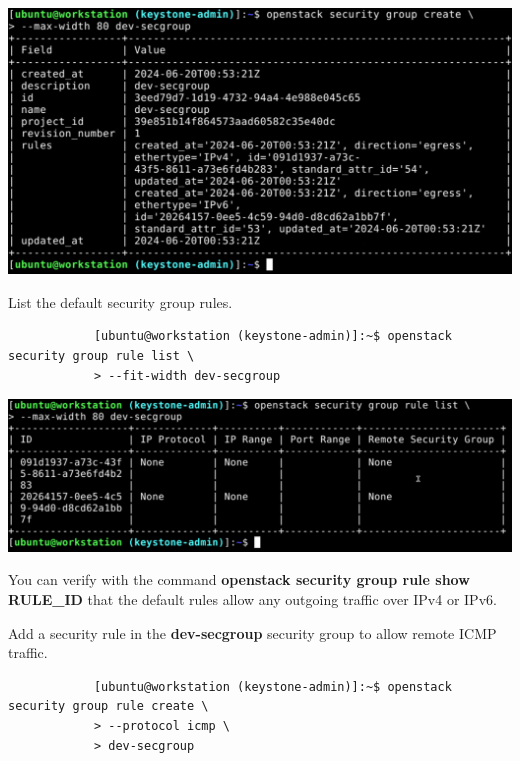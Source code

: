 \documentclass[letterpaper, 12pt]{article}
\begin{document}
\begin{enumerate}
\begin{labstep}
        \begin{center}
            \includegraphics[width=\linewidth]{images/part1/step25.png}
        \end{center}
    \end{labstep}

    \begin{labstep}
        List the default security group rules.
        \begin{lstlisting}
            [ubuntu@workstation (keystone-admin)]:~$ openstack security group rule list \
            > --fit-width dev-secgroup
        \end{lstlisting}

        \begin{center}
            \includegraphics[width=\linewidth]{images/part1/step26.png}
        \end{center}
    \end{labstep}

    \begin{notebox}
        You can verify with the command \textbf{openstack security group rule show RULE\_ID} that the default rules allow any outgoing traffic over IPv4 or IPv6.
    \end{notebox}

    \begin{labstep}
        Add a security rule in the \textbf{dev-secgroup} security group to allow remote ICMP traffic.
        \begin{lstlisting}
            [ubuntu@workstation (keystone-admin)]:~$ openstack security group rule create \
            > --protocol icmp \
            > dev-secgroup
        \end{lstlisting}


\end{labstep}
\end{enumerate}
\end{document}
